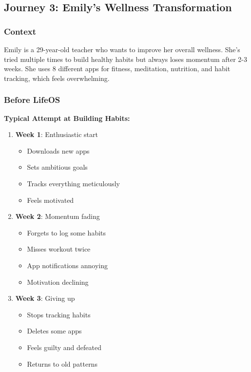 \subsection{Journey 3: Emily's Wellness Transformation}

\subsubsection{Context}

Emily is a 29-year-old teacher who wants to improve her overall wellness. She's tried multiple times to build healthy habits but always loses momentum after 2-3 weeks. She uses 8 different apps for fitness, meditation, nutrition, and habit tracking, which feels overwhelming.

\subsubsection{Before LifeOS}

\textbf{Typical Attempt at Building Habits:}
\begin{enumerate}
    \item \textbf{Week 1}: Enthusiastic start
    \begin{itemize}
        \item Downloads new apps
        \item Sets ambitious goals
        \item Tracks everything meticulously
        \item Feels motivated
    \end{itemize}
    
    \item \textbf{Week 2}: Momentum fading
    \begin{itemize}
        \item Forgets to log some habits
        \item Misses workout twice
        \item App notifications annoying
        \item Motivation declining
    \end{itemize}
    
    \item \textbf{Week 3}: Giving up
    \begin{itemize}
        \item Stops tracking habits
        \item Deletes some apps
        \item Feels guilty and defeated
        \item Returns to old patterns
    \end{itemize}
\end{enumerate}

